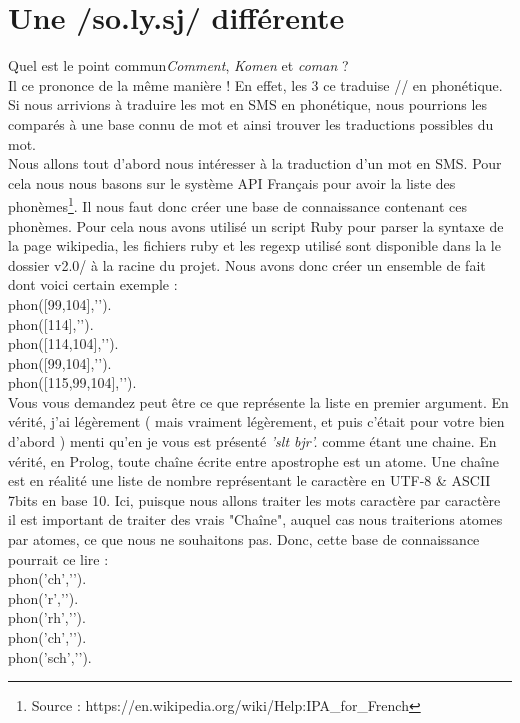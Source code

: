 \documentclass[11pt]{book}
\begin{document}
	\section{Une /so.ly.sj/ différente}
	Quel est le point commun{\em Comment}, {\em Komen} et {\em coman} ?\\
	Il ce prononce de la même manière ! En effet, les 3 ce traduise // en phonétique. Si nous arrivions à traduire les mot en SMS en phonétique, nous pourrions les comparés à une base connu de mot et ainsi trouver les traductions possibles du mot.\\
	Nous allons tout d'abord nous intéresser à la traduction d'un mot en SMS. Pour cela nous nous basons sur le système API Français pour avoir la liste des phonèmes\footnote{Source : https://en.wikipedia.org/wiki/Help:IPA\_for\_French}. Il nous faut donc créer une base de connaissance contenant ces phonèmes. Pour cela nous avons utilisé un script Ruby pour parser la syntaxe de la page wikipedia, les fichiers ruby et les regexp utilisé sont disponible dans la le dossier v2.0/ à la racine du projet.
	Nous avons donc créer un ensemble de fait dont voici certain exemple :\\
	
	\indent phon([99,104],'').\\
	\indent phon([114],'').\\
	\indent phon([114,104],'').\\
	\indent phon([99,104],'').\\
	\indent phon([115,99,104],'').\\
	
	Vous vous demandez peut être ce que représente la liste en premier argument. En vérité, j'ai légèrement ( mais vraiment légèrement, et puis c'était pour votre bien d'abord ) menti qu'en je vous est présenté {\em 'slt bjr'.} comme étant une chaine. En vérité, en Prolog, toute chaîne écrite entre apostrophe est un atome. Une chaîne est en réalité une liste de nombre représentant le caractère en UTF-8 \& ASCII 7bits en base 10. Ici, puisque nous allons traiter les mots caractère par caractère il est important de traiter des vrais "Chaîne", auquel cas nous traiterions atomes par atomes, ce que nous ne souhaitons pas. Donc, cette base de connaissance pourrait ce lire :\\
	
	\indent phon('ch','').\\
	\indent phon('r','').\\
	\indent phon('rh','').\\
	\indent phon('ch','').\\
	\indent phon('sch','').\\
	
\end{document}
